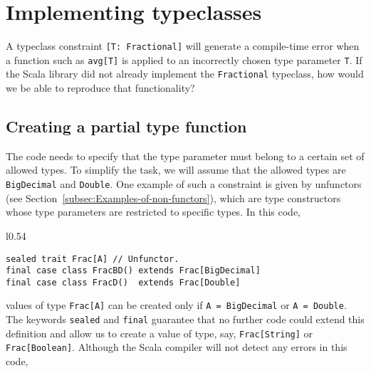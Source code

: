 \section{Implementing typeclasses}

A typeclass constraint \lstinline![T: Fractional]! will generate
a compile-time error when a function such as \lstinline!avg[T]! is
applied to an incorrectly chosen type parameter \lstinline!T!. If
the Scala library did not already implement the \lstinline!Fractional!
typeclass, how would we be able to reproduce that functionality?

\begin{comment}
we will implement a limited version of \lstinline!avg! for a tuple
of three values:
\begin{lstlisting}
def avg[T](s: (T, T, T)): T = ???
\end{lstlisting}
The type parameter \lstinline!T! must be restricted to types for
which addition and division by integer are defined. For this example,
we will assume that the possible types are \lstinline!BigDecimal!
and \lstinline!Double!.
\end{comment}


\subsection{Creating a partial type function}

The code needs to specify that the type parameter must belong to a
certain set of allowed types. To simplify the task, we will assume
that the allowed types are \lstinline!BigDecimal! and \lstinline!Double!.
One example of such a constraint is given by unfunctors
(see Section~\ref{subsec:Examples-of-non-functors}), which are type
constructors whose type parameters are restricted to specific types.
In this code,

\begin{wrapfigure}{l}{0.54\columnwidth}%
\vspace{-0.75\baselineskip}
\begin{lstlisting}
sealed trait Frac[A] // Unfunctor.
final case class FracBD() extends Frac[BigDecimal]
final case class FracD()  extends Frac[Double]
\end{lstlisting}

\vspace{-0.75\baselineskip}
\end{wrapfigure}%

\noindent values of type \lstinline!Frac[A]! can be created only
if \lstinline!A = BigDecimal! or \lstinline!A = Double!. The keywords
\lstinline!sealed! and \lstinline!final! guarantee that no further
code could extend this definition and allow us to create a value of
type, say, \lstinline!Frac[String]! or \lstinline!Frac[Boolean]!.
Although the Scala compiler will not detect any errors in this code,

